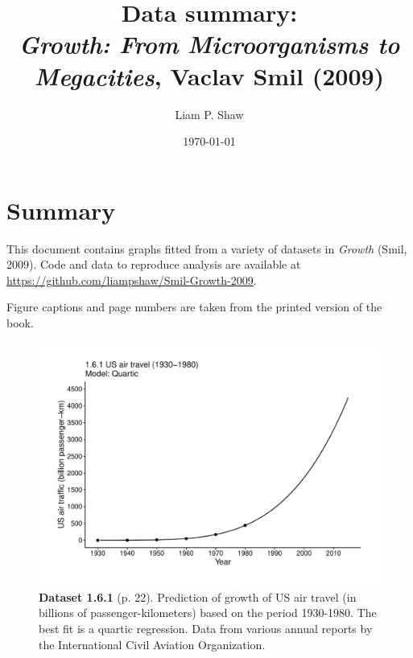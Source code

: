 \documentclass[aps,rmp,preprint,superscriptaddress,10pt,onecolumn]{article}
\begin{document}
\title{Data summary:\\\textit{Growth: From Microorganisms to Megacities}, Vaclav Smil (2009)}
\author{Liam P. Shaw}
\date{\today}


\maketitle

\section*{Summary}

\noindent This document contains graphs fitted from a variety of datasets in \textit{Growth} (Smil, 2009). Code and data to reproduce analysis are available at \url{https://github.com/liampshaw/Smil-Growth-2009}.

\par

Figure captions and page numbers are taken from the printed version of the book. \\ 
\clearpage
\begin{figure}[h]
\includegraphics[width=\textwidth]{output/figs-ggplot/1.6.1.pdf}
\caption*{\textbf{Dataset 1.6.1} (p. 22). Prediction of growth of US air travel (in billions of passenger-kilometers) based on the period 1930-1980. The best fit is a quartic regression. Data from various annual reports by the International Civil Aviation Organization. }
\end{figure}
	
\end{document}
